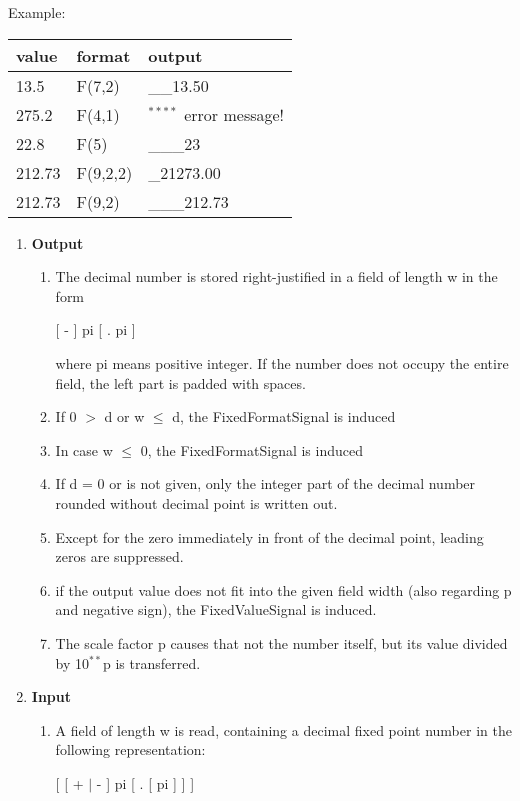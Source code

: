 \begin{removed}
Example:

\begin{tabular}{lll}
value  & format   & output \\ \hline
13.5   & F(7,2)   & \_\_13.50  \\
275.2  & F(4,1)   & $^{****}$ \x \x error message! \\
22.8   & F(5)     & \_\_\_23 \\
212.73 & F(9,2,2) & \_21273.00 \\
212.73 & F(9,2)   & \_\_\_212.73
\end{tabular}
\end{removed}

\begin{added}
\begin{enumerate}
\item {\bf Output}
\begin{enumerate}
\item The decimal number is stored right-justified in a field of length
w in the form

[ - ] pi [ . pi ]

where pi means positive integer. If the number does not occupy the
entire field, the left part is padded with spaces.
\item If 0 $>$ d or w $\leq$ d, the FixedFormatSignal is induced
\item In case w $\leq$ 0, the FixedFormatSignal is induced
\item If d = 0 or is not given, only the integer part of the decimal
number rounded without decimal point is written out.
\item Except for the zero immediately in front of the decimal point,
leading zeros are suppressed.
\item if the output value does not fit into the given field width 
   (also regarding p and negative sign), the FixedValueSignal is induced.
\item The scale factor p causes that not the number itself, but its
value divided by 10$^{**}$p is transferred.
\end{enumerate}
\item {\bf Input}
\begin{enumerate}
\item A field of length w is read, containing a decimal fixed point
number in the following representation:

[ [ + $\mid$ - ] pi [ . [ pi ] ] ]


\end{enumerate}
\end{enumerate}
\end{added}
